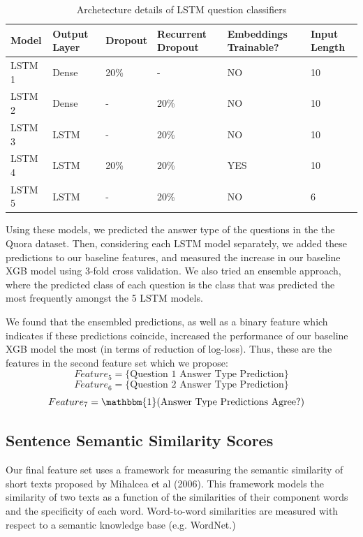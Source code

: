 \documentclass[letterpaper, 10 pt, conference]{ieeeconf}  %
\begin{document}
\begin{table}[]
\centering
\caption{Archetecture details of LSTM question classifiers }
\label{my-label}
\begin{tabular}{|p{10mm}|p{10mm}|p{10mm}|p{10mm}|p{14mm}|p{8mm}|}
\hline
Model  & Output Layer & Dropout  & Recurrent Dropout & Embeddings Trainable? & Input Length \\ \hline
LSTM 1 & Dense             & 20\%                   & -                 & NO                    & 10           \\
LSTM 2 & Dense             & -                      & 20\%              & NO                    & 10           \\
LSTM 3 & LSTM              & -                      & 20\%              & NO                    & 10           \\
LSTM 4 & LSTM              & 20\%                   & 20\%              & YES                   & 10           \\
LSTM 5 & LSTM              & -                      & 20\%              & NO                    & 6            \\ \hline
\end{tabular}
\end{table}

Using these models, we predicted the answer type of the questions in the the Quora dataset. Then, considering each LSTM model separately, we added these predictions to our baseline features, and measured the increase in our baseline XGB model using 3-fold cross validation. We also tried an ensemble approach, where the predicted class of each question is the class that was predicted the most frequently amongst the 5 LSTM models.

We found that the ensembled predictions, as well as a binary feature which indicates if these predictions coincide, increased the performance of our baseline XGB model the most (in terms of reduction of log-loss). Thus, these are the features in the second feature set which we propose: 
$$
Feature_5 = \text{\{Question 1 Answer Type Prediction\}}
$$
$$
Feature_6 = \text{\{Question 2 Answer Type Prediction\}}
$$
$$
Feature_7 = \mathbbm{1}(\text{Answer Type Predictions Agree?})\quad
$$
\subsection{Sentence Semantic Similarity Scores}

Our final feature set uses a framework for measuring the semantic similarity of short texts proposed by Mihalcea et al (2006). This framework models the similarity of two texts as a function of the similarities of their component words and the specificity of each word. Word-to-word similarities are measured with respect to a semantic knowledge base (e.g. WordNet.)
\end{document}
